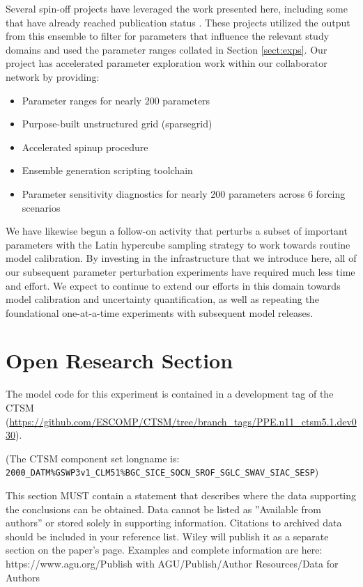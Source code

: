 \documentclass[draft]{agujournal2019}
\begin{document}
Several spin-off projects have leveraged the work presented here, including some that have already reached publication status \cite{cheng2023,yan2023a,yan2023b}. These projects utilized the output from this ensemble to filter for parameters that influence the relevant study domains and used the parameter ranges collated in Section \ref{sect:exps}. Our project has accelerated parameter exploration work within our collaborator network by providing:

\begin{itemize}
\item Parameter ranges for nearly 200 parameters
\item Purpose-built unstructured grid (sparsegrid)
\item Accelerated spinup procedure
\item Ensemble generation scripting toolchain
\item Parameter sensitivity diagnostics for nearly 200 parameters across 6 forcing scenarios
\end{itemize} 

We have likewise begun a follow-on activity that perturbs a subset of important parameters with the Latin hypercube sampling strategy \cite{mckay2000} to work towards routine model calibration. By investing in the infrastructure that we introduce here, all of our subsequent parameter perturbation experiments have required much less time and effort. We expect to continue to extend our efforts in this domain towards model calibration and uncertainty quantification, as well as repeating the foundational one-at-a-time experiments with subsequent model releases.

\section*{Open Research Section}

The model code for this experiment is contained in a development tag of the CTSM (\url{https://github.com/ESCOMP/CTSM/tree/branch_tags/PPE.n11_ctsm5.1.dev030}).

 (The CTSM component set longname is: \\ \texttt{2000\_DATM\%GSWP3v1\_CLM51\%BGC\_SICE\_SOCN\_SROF\_SGLC\_SWAV\_SIAC\_SESP})

This section MUST contain a statement that describes where the data supporting the conclusions can be obtained. Data cannot be listed as ''Available from authors'' or stored solely in supporting information. Citations to archived data should be included in your reference list. Wiley will publish it as a separate section on the paper’s page. Examples and complete information are here:
https://www.agu.org/Publish with AGU/Publish/Author Resources/Data for Authors
\end{document}
